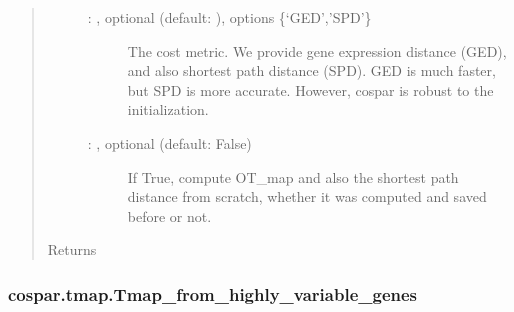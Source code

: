 \documentclass[letterpaper,10pt,english]{sphinxmanual}
\begin{document}
\begin{fulllineitems}
\begin{quote}
\begin{description}
\begin{description}
\item[{ : , optional (default: ), options \{‘GED’,’SPD’\}}] \leavevmode
The cost metric. We provide gene expression distance (GED), and also
shortest path distance (SPD). GED is much faster, but SPD is more accurate.
However, cospar is robust to the initialization.

\item[{ : , optional (default: False)}] \leavevmode
If True, compute OT\_map and also the shortest path distance from scratch,
whether it was computed and saved before or not.

\end{description}

\item[{Returns}] \leavevmode
{}

\end{description}\end{quote}

\end{fulllineitems}



\subsubsection{cospar.tmap.Tmap\_from\_highly\_variable\_genes}
\label{\detokenize{cospar.tmap.Tmap_from_highly_variable_genes:cospar-tmap-tmap-from-highly-variable-genes}}\label{\detokenize{cospar.tmap.Tmap_from_highly_variable_genes::doc}}
\end{document}
